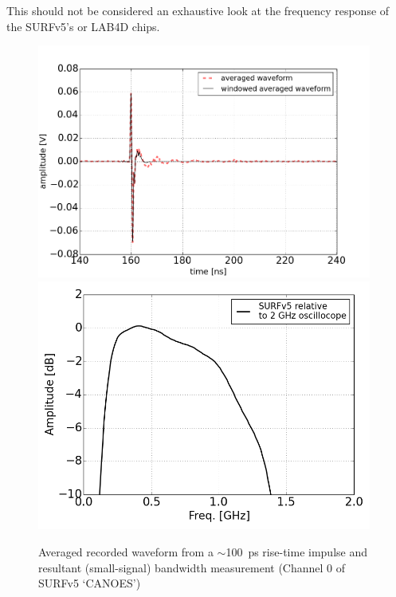 \documentclass[11pt]{article}
\begin{document}
This should not be considered an exhaustive look at the frequency response of the SURFv5's or LAB4D chips.
\begin{figure}[h!]
    \begin{center}
      \hspace{10pt}
      \includegraphics[width=11cm]{fig/bandwidth_waveforms.png} \\
      \includegraphics[width=11cm]{fig/bandwidth_surfV5.png}
    \end{center}
    \caption{Averaged recorded waveform from a $\sim$100~ps rise-time impulse and resultant (small-signal) bandwidth measurement (Channel 0 of SURFv5 `CANOES')}
    \label{fig:bwplots}
\end{figure}



\clearpage

\appendix



\end{document}
